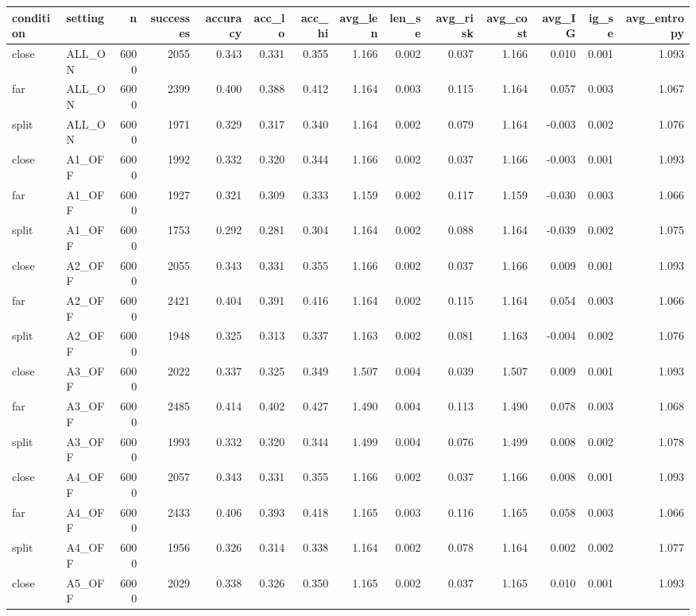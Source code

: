 \begin{tabular}{llrrrrrrrrrrrr}
\toprule
condition & setting & n & successes & accuracy & acc_lo & acc_hi & avg_len & len_se & avg_risk & avg_cost & avg_IG & ig_se & avg_entropy \\
\midrule
close & ALL_ON & 6000 & 2055 & 0.343 & 0.331 & 0.355 & 1.166 & 0.002 & 0.037 & 1.166 & 0.010 & 0.001 & 1.093 \\
far & ALL_ON & 6000 & 2399 & 0.400 & 0.388 & 0.412 & 1.164 & 0.003 & 0.115 & 1.164 & 0.057 & 0.003 & 1.067 \\
split & ALL_ON & 6000 & 1971 & 0.329 & 0.317 & 0.340 & 1.164 & 0.002 & 0.079 & 1.164 & -0.003 & 0.002 & 1.076 \\
close & A1_OFF & 6000 & 1992 & 0.332 & 0.320 & 0.344 & 1.166 & 0.002 & 0.037 & 1.166 & -0.003 & 0.001 & 1.093 \\
far & A1_OFF & 6000 & 1927 & 0.321 & 0.309 & 0.333 & 1.159 & 0.002 & 0.117 & 1.159 & -0.030 & 0.003 & 1.066 \\
split & A1_OFF & 6000 & 1753 & 0.292 & 0.281 & 0.304 & 1.164 & 0.002 & 0.088 & 1.164 & -0.039 & 0.002 & 1.075 \\
close & A2_OFF & 6000 & 2055 & 0.343 & 0.331 & 0.355 & 1.166 & 0.002 & 0.037 & 1.166 & 0.009 & 0.001 & 1.093 \\
far & A2_OFF & 6000 & 2421 & 0.404 & 0.391 & 0.416 & 1.164 & 0.002 & 0.115 & 1.164 & 0.054 & 0.003 & 1.066 \\
split & A2_OFF & 6000 & 1948 & 0.325 & 0.313 & 0.337 & 1.163 & 0.002 & 0.081 & 1.163 & -0.004 & 0.002 & 1.076 \\
close & A3_OFF & 6000 & 2022 & 0.337 & 0.325 & 0.349 & 1.507 & 0.004 & 0.039 & 1.507 & 0.009 & 0.001 & 1.093 \\
far & A3_OFF & 6000 & 2485 & 0.414 & 0.402 & 0.427 & 1.490 & 0.004 & 0.113 & 1.490 & 0.078 & 0.003 & 1.068 \\
split & A3_OFF & 6000 & 1993 & 0.332 & 0.320 & 0.344 & 1.499 & 0.004 & 0.076 & 1.499 & 0.008 & 0.002 & 1.078 \\
close & A4_OFF & 6000 & 2057 & 0.343 & 0.331 & 0.355 & 1.166 & 0.002 & 0.037 & 1.166 & 0.008 & 0.001 & 1.093 \\
far & A4_OFF & 6000 & 2433 & 0.406 & 0.393 & 0.418 & 1.165 & 0.003 & 0.116 & 1.165 & 0.058 & 0.003 & 1.066 \\
split & A4_OFF & 6000 & 1956 & 0.326 & 0.314 & 0.338 & 1.164 & 0.002 & 0.078 & 1.164 & 0.002 & 0.002 & 1.077 \\
close & A5_OFF & 6000 & 2029 & 0.338 & 0.326 & 0.350 & 1.165 & 0.002 & 0.037 & 1.165 & 0.010 & 0.001 & 1.093 \\

\end{tabular}
